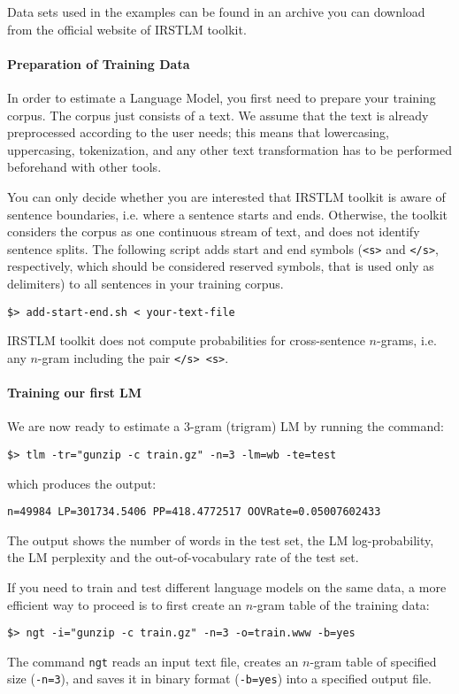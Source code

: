 \documentclass[11pt]{article}
\begin{document}
\noindent
Data sets used in the examples can be  found in an archive you can download from the official website of IRSTLM toolkit.




\paragraph{Preparation of Training Data}
In order to estimate a Language Model, you first need to prepare your training corpus. The corpus just consists of a text.
We assume that the text is already preprocessed according to the user needs; this means that lowercasing, uppercasing, tokenization, and any other text transformation has to be performed beforehand with other tools.

\noindent
You can only decide whether you are interested that IRSTLM toolkit is aware
of sentence boundaries, i.e. where a sentence starts and ends. Otherwise,
the toolkit considers the corpus as one continuous stream of text, and does
not identify sentence splits.  The following script adds start and end
symbols ({\tt <s>} and {\tt </s>}, respectively, which should be considered
reserved symbols, that is used only as delimiters) to all
sentences in your training corpus.
\begin{verbatim}
$> add-start-end.sh < your-text-file 
\end{verbatim}
IRSTLM toolkit does not compute probabilities for cross-sentence $n$-grams,
i.e. any $n$-gram including the pair {\tt </s>  <s>}.


\paragraph{Training our first LM}
\noindent
We  are now ready to estimate a  3-gram (trigram)  LM by  running the command:

\begin{verbatim}
$> tlm -tr="gunzip -c train.gz" -n=3 -lm=wb -te=test
\end{verbatim}
\noindent
which produces the output:
\begin{verbatim}
n=49984 LP=301734.5406 PP=418.4772517 OOVRate=0.05007602433
\end{verbatim}
\noindent
The output shows the number of  words in the test set, the LM log-probability, the LM perplexity  
and the out-of-vocabulary rate  of the test set.

\noindent
If you need  to train and test different language  models on the same data, a  more efficient 
way to  proceed is to first  create an $n$-gram table of the training data:
\begin{verbatim}
$> ngt -i="gunzip -c train.gz" -n=3 -o=train.www -b=yes
\end{verbatim}
\noindent
The command {\tt ngt} reads an  input text file, creates an  $n$-gram table of specified size ({\tt -n=3}), and 
saves it in binary format ({\tt -b=yes}) into a specified output file.
\end{document}
